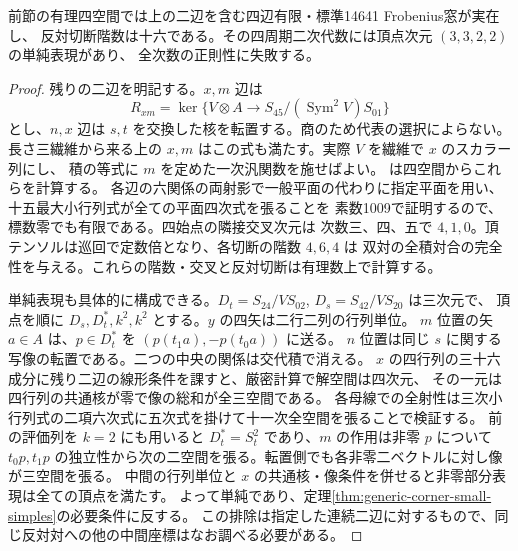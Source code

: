 \begin{proposition}\label{prop:quadric-rational-frobenius-counterexample}
前節の有理四空間では上の二辺を含む四辺有限・標準14641 Frobenius窓が実在し、
反対切断階数は十六である。その四周期二次代数には頂点次元 $(3,3,2,2)$ の単純表現があり、
全次数の正則性に失敗する。
\end{proposition}
\begin{proof}
残りの二辺を明記する。$x,m$ 辺は
\[
       R_{xm}=\ker\{ V\otimes A\longrightarrow S_{45}/(\operatorname{Sym}^2 V) S_{01}\}
\]
とし、$n,x$ 辺は $s,t$ を交換した核を転置する。商のため代表の選択によらない。
長さ三繊維から来る上の $x,m$ はこの式も満たす。実際 $V$ を繊維で $x$ のスカラー列にし、
積の等式に $m$ を定めた一次汎関数を施せばよい。
 は四空間からこれらを計算する。
各辺の六関係の両射影で一般平面の代わりに指定平面を用い、十五最大小行列式が全ての平面四次式を張ることを
素数1009で証明するので、標数零でも有限である。四始点の隣接交叉次元は
次数三、四、五で $4,1,0$。頂テンソルは巡回で定数倍となり、各切断の階数 $4,6,4$ は
双対の全積対合の完全性を与える。これらの階数・交叉と反対切断は有理数上で計算する。

単純表現も具体的に構成できる。$D_t=S_{24}/V S_{02}$, $D_s=S_{42}/V S_{20}$ は三次元で、
頂点を順に $D_s,D_t^*,k^2,k^2$ とする。$y$ の四矢は二行二列の行列単位。
$m$ 位置の矢 $a\in A$ は、$p\in D_t^*$ を $(p(t_1a),-p(t_0a))$ に送る。
$n$ 位置は同じ $s$ に関する写像の転置である。二つの中央の関係は交代積で消える。
$x$ の四行列の三十六成分に残り二辺の線形条件を課すと、厳密計算で解空間は四次元、
その一元は四行列の共通核が零で像の総和が全三空間である。
各母線での全射性は三次小行列式の二項六次式に五次式を掛けて十一次全空間を張ることで検証する。
前の評価列を $k=2$ にも用いると $D_t^*=S_t^2$ であり、$m$ の作用は非零 $p$ について
$t_0p,t_1p$ の独立性から次の二空間を張る。転置側でも各非零二ベクトルに対し像が三空間を張る。
中間の行列単位と $x$ の共通核・像条件を併せると非零部分表現は全ての頂点を満たす。
よって単純であり、定理\ref{thm:generic-corner-small-simples}の必要条件に反する。
この排除は指定した連続二辺に対するもので、同じ反対対への他の中間座標はなお調べる必要がある。
\end{proof}
